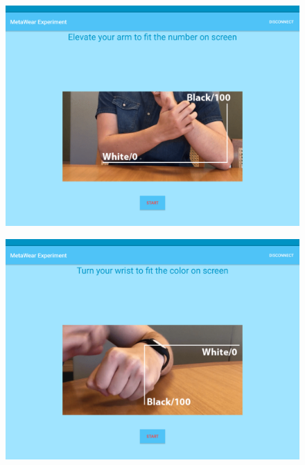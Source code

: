 \begin{figure}[h!]
\centering
\begin{minipage}{.55\textwidth}
  \centering
  \includegraphics[width=0.95\linewidth]{figures/tablet_screen12.png}
  \label{app_arm_explain}
\end{minipage}%
\begin{minipage}{.55\textwidth}
  \centering
  \includegraphics[width=0.95\linewidth]{figures/tablet_screen13.png}
  \label{app_wrist_explain}
\end{minipage}
\end{figure}


